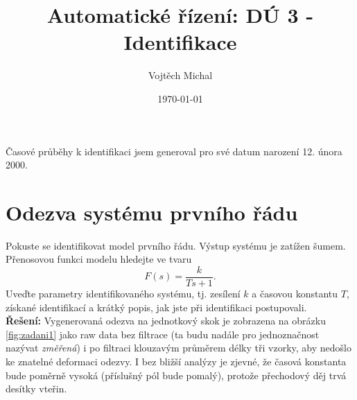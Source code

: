 \documentclass[twoside]{article}
\title{Automatické řízení: DÚ 3 - Identifikace}
\author{Vojtěch Michal}
\date{\today}
\begin{document}
\maketitle


Časové průběhy k identifikaci jsem generoval pro své datum narození 12. února 2000.

\section{Odezva systému prvního řádu}
Pokuste se identifikovat model prvního řádu. Výstup systému je zatížen šumem. Přenosovou funkci
modelu hledejte ve tvaru
\begin{equation}
	\label{eq:obecne1}
	F(s) = \frac{k}{Ts + 1}.
\end{equation}
Uveďte parametry identifikovaného systému, tj. zesílení $k$ a časovou konstantu $T$, získané identifikací a
krátký popis, jak jste při identifikaci postupovali. \\
\textbf{Řešení:} Vygenerovaná odezva na jednotkový skok je zobrazena na obrázku \ref{fig:zadani1}
jako raw data bez filtrace (ta budu nadále pro jednoznačnost nazývat \textit{změřená}) i po filtraci klouzavým průměrem délky tři vzorky, aby nedošlo ke znatelné deformaci odezvy.
I bez bližší analýzy je zjevné, že časová konstanta bude poměrně vysoká (příslušný pól bude pomalý), protože přechodový děj trvá desítky vteřin. 
\end{document}
